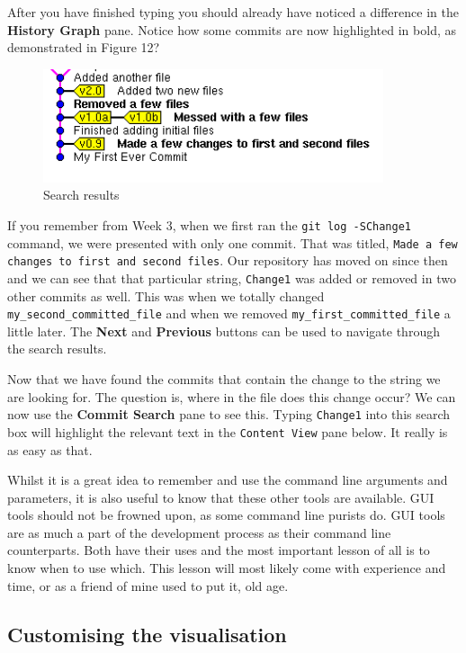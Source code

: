 After you have finished typing you should already have noticed a difference in the \textbf{History Graph} pane.
Notice how some commits are now highlighted in bold, as demonstrated in Figure 12?

\begin{figure}[hbt]
\centering
\includegraphics[width=10cm]{images/f-w5-d12.png}
\caption{Search results}
\end{figure}

If you remember from Week 3, when we first ran the \texttt{git log -SChange1} command, we were presented with only one commit.
That was titled, \texttt{Made a few changes to first and second files}.
Our repository has moved on since then and we can see that that particular string, \texttt{Change1} was added or removed in two other commits as well.
This was when we totally changed \texttt{my\_second\_committed\_file} and when we removed \texttt{my\_first\_committed\_file} a little later.
The \textbf{Next} and \textbf{Previous} buttons can be used to navigate through the search results.

Now that we have found the commits that contain the change to the string we are looking for.
The question is, where in the file does this change occur? We can now use the \textbf{Commit Search} pane to see this.
Typing \texttt{Change1} into this search box will highlight the relevant text in the \texttt{Content View} pane below.
It really is as easy as that.

Whilst it is a great idea to remember and use the command line arguments and parameters, it is also useful to know that these other tools are available.
GUI tools should not be frowned upon, as some command line purists do.
GUI tools are as much a part of the development process as their command line counterparts.
Both have their uses and the most important lesson of all is to know when to use which.
This lesson will most likely come with experience and time, or as a friend of mine used to put it, old age.

\subsection{Customising the visualisation}

